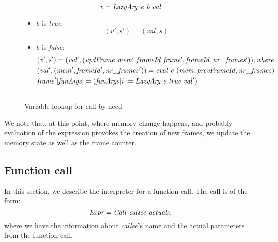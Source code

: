 \documentclass[diploma]{softlab-thesis}
\begin{document}
\begin{itemize}
    \begin{figure}[t]
      \[\mathit{v = LazyArg \hfill\ e \hfill\ b \hfill\ val}\]
      
      \begin{itemize}
          \item \textit{b} is \textit{true}: \[ \mathit{(v', s') = (val, s)} \]
          \item \textit{b} is \textit{false}:
            \begin{align*}
                & \mathit{(v', s') = (val', (updFrame \hfill\ mem' \hfill\ frameId \hfill\ frame', frameId, nr\_frames')), where} \\
                & \mathit{(val', (mem', frameId', nr\_frames')) = eval \hfill\ e \hfill\ (mem, prevFrameId, nr\_frames)} \\
                & \mathit{frame'[funArgs] = ( funArgs[i] = LazyArg \hfill\ e \hfill\ true \hfill\ val' )} \\
            \end{align*}
      \end{itemize}
    \caption{Variable lookup for call-by-need\label{fig:lazy-varlookup}}
    \hrule
  \end{figure}


  We note that, at this point, where memory change happens, and probably evaluation of the expression provokes 
  the creation of new frames, we update the memory state as well as the frame counter. 

  \end{itemize}
  
\subsection{Function call}

In this section, we describe the interpreter for a function call. The call is of the form:
\[ 
  \mathit{Expr = Call \hfill\ callee \hfill\ actuals,} 
\]
where we have the information about \textit{callee}'s name and the actual parameters from the function call. 
\end{document}
